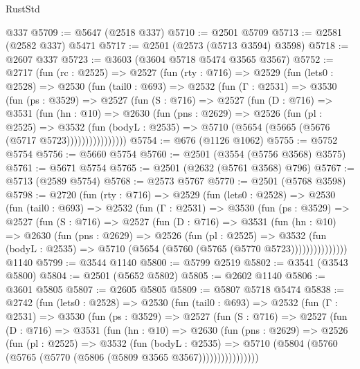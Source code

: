 \begin{lexlean}{RustStd}
\begin{coremodule}
{\begin{coremodule}
{{{{{{{{{{{{{{{{{{{{    @337
@5709 := @5647 (@2518 @337)
@5710 := @2501 @5709
@5713 := @2581 (@2582 @337) @5471
@5717 := @2501 (@2573 (@5713 @3594) @3598)
@5718 := @2607 @337
@5723 := @3603 (@3604 @5718 @5474 @3565 @3567)
@5752 := @2717
    (fun (rc : @2525) =>
    @2527
      (fun (rty : @716) =>
      @2529
        (fun (lets0 : @2528) =>
        @2530
          (fun (tail0 : @693) =>
          @2532
            (fun (Γ : @2531) =>
            @3530
              (fun (ps : @3529) =>
              @2527
                (fun (S : @716) =>
                @2527
                  (fun (D : @716) =>
                  @3531
                    (fun (hn : @10) =>
                    @2630
                      (fun (pns : @2629) =>
                      @2526
                        (fun (pl : @2525) =>
                        @3532
                          (fun (bodyL : @2535) =>
                          @5710 (@5654 (@5665 (@5676 (@5717 @5723))))))))))))))))
@5754 := @676 (@1126 @1062)
@5755 := @5752 @5754
@5756 := @5660 @5754
@5760 := @2501 (@3554 (@5756 @3568) @3575)
@5761 := @5671 @5754
@5765 := @2501 (@2632 (@5761 @3568) @796)
@5767 := @5713 (@2589 @5754)
@5768 := @2573 @5767
@5770 := @2501 (@5768 @3598)
@5798 := @2720
    (fun (rty : @716) =>
    @2529
      (fun (lets0 : @2528) =>
      @2530
        (fun (tail0 : @693) =>
        @2532
          (fun (Γ : @2531) =>
          @3530
            (fun (ps : @3529) =>
            @2527
              (fun (S : @716) =>
              @2527
                (fun (D : @716) =>
                @3531
                  (fun (hn : @10) =>
                  @2630
                    (fun (pns : @2629) =>
                    @2526
                      (fun (pl : @2525) =>
                      @3532
                        (fun (bodyL : @2535) =>
                        @5710 (@5654 (@5760 (@5765 (@5770 @5723)))))))))))))))
    @1140
@5799 := @3544 @1140
@5800 := @5799 @2519
@5802 := @3541 (@3543 @5800)
@5804 := @2501 (@5652 @5802)
@5805 := @2602 @1140
@5806 := @3601 @5805
@5807 := @2605 @5805
@5809 := @5807 @5718 @5474
@5838 := @2742
    (fun (lets0 : @2528) =>
    @2530
      (fun (tail0 : @693) =>
      @2532
        (fun (Γ : @2531) =>
        @3530
          (fun (ps : @3529) =>
          @2527
            (fun (S : @716) =>
            @2527
              (fun (D : @716) =>
              @3531
                (fun (hn : @10) =>
                @2630
                  (fun (pns : @2629) =>
                  @2526
                    (fun (pl : @2525) =>
                    @3532
                      (fun (bodyL : @2535) =>
                      @5710 (@5804 (@5760 (@5765 (@5770 (@5806 (@5809 @3565 @3567))))))))))))))))
}}}}}}}}}}}}}}}}}}}}
\end{coremodule}}
\end{coremodule}
\end{lexlean}

